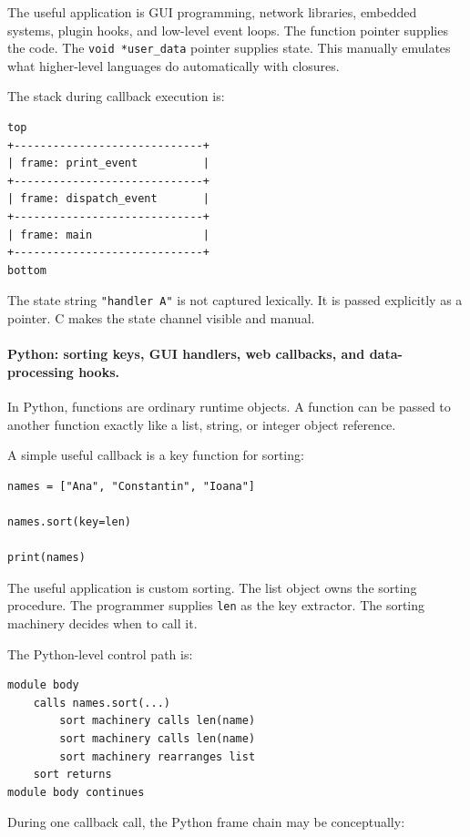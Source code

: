 The useful application is GUI programming, network libraries, embedded systems, plugin hooks, and low-level event loops. The function pointer supplies the code. The \texttt{void *user\_data} pointer supplies state. This manually emulates what higher-level languages do automatically with closures.

The stack during callback execution is:

\begin{verbatim}
top
+-----------------------------+
| frame: print_event          |
+-----------------------------+
| frame: dispatch_event       |
+-----------------------------+
| frame: main                 |
+-----------------------------+
bottom
\end{verbatim}

The state string \texttt{"handler A"} is not captured lexically. It is passed explicitly as a pointer. C makes the state channel visible and manual.

\paragraph{Python: sorting keys, GUI handlers, web callbacks, and data-processing hooks.}

In Python, functions are ordinary runtime objects. A function can be passed to another function exactly like a list, string, or integer object reference.

A simple useful callback is a key function for sorting:

\begin{verbatim}
names = ["Ana", "Constantin", "Ioana"]

names.sort(key=len)

print(names)
\end{verbatim}

The useful application is custom sorting. The list object owns the sorting procedure. The programmer supplies \texttt{len} as the key extractor. The sorting machinery decides when to call it.

The Python-level control path is:

\begin{verbatim}
module body
    calls names.sort(...)
        sort machinery calls len(name)
        sort machinery calls len(name)
        sort machinery rearranges list
    sort returns
module body continues
\end{verbatim}

During one callback call, the Python frame chain may be conceptually:

